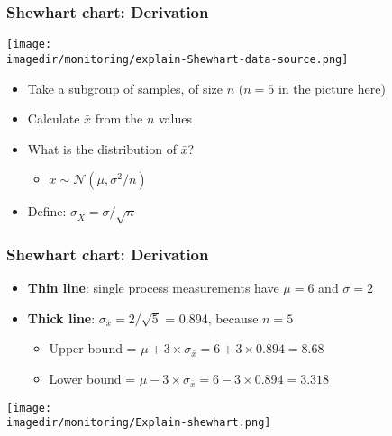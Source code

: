 \begin{frame}\frametitle{Shewhart chart: Derivation}
	\begin{center}
		\texttt{[image: \\imagedir/monitoring/explain-Shewhart-data-source.png]}
	\end{center}
	
	\begin{itemize}
		\item	Take a subgroup of samples, of size $n$ {\small ($n=5$ in the picture here)}
		\item	Calculate $\bar{x}$ from the $n$ values
		\item	What is the distribution of $\bar{x}$?
		\begin{itemize}
			\item	$\bar{x} \sim \mathcal{N}(\mu, \sigma^2/n)$
		\end{itemize}
		\item	Define: $\sigma_{\bar{X}} = \sigma/\sqrt{n}$
	\end{itemize}
\end{frame}

\begin{frame}\frametitle{Shewhart chart: Derivation}
	\begin{itemize}
		\item	\textbf{Thin line}: single process measurements have $\mu = 6$ and $\sigma = 2$
		\item	\textbf{Thick line}: $\sigma_{\overline{x}} = 2/\sqrt{5}$ = 0.894, because $n=5$
		\begin{itemize}
			\item	Upper bound = $\mu + 3 \times \sigma_{\overline{x}} = 6 + 3\times 0.894 = 8.68$
			\item	Lower bound = $\mu - 3 \times \sigma_{\overline{x}} = 6 - 3\times 0.894 = 3.318$
		\end{itemize}
	\end{itemize}

	\begin{center}
		\texttt{[image: \\imagedir/monitoring/Explain-shewhart.png]}
	\end{center}
\end{frame}

